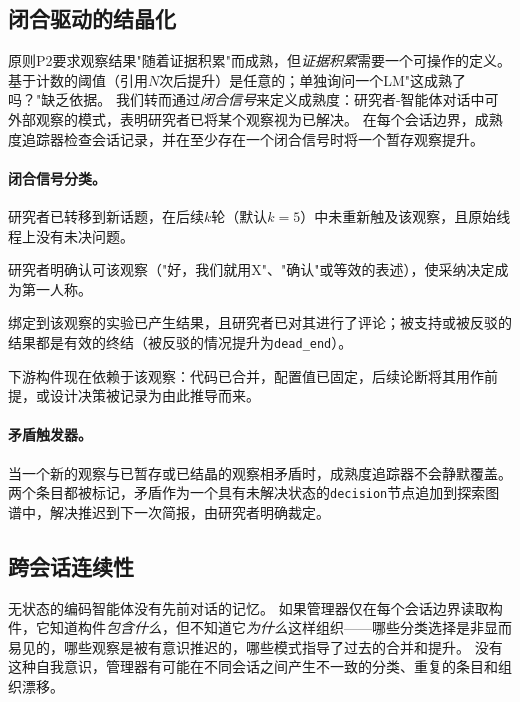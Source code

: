 \subsection{闭合驱动的结晶化}
\label{sec-lrm-maturity}

原则P2要求观察结果"随着证据积累"而成熟，但\emph{证据积累}需要一个可操作的定义。
基于计数的阈值（引用$N$次后提升）是任意的；单独询问一个LM"这成熟了吗？"缺乏依据。
我们转而通过\emph{闭合信号}来定义成熟度：研究者-智能体对话中可外部观察的模式，表明研究者已将某个观察视为已解决。
在每个会话边界，成熟度追踪器检查会话记录，并在至少存在一个闭合信号时将一个暂存观察提升。

\paragraph{闭合信号分类。}
\begin{description}[leftmargin=1.5em, itemsep=2pt, topsep=2pt]
    \item[话题放弃。] 研究者已转移到新话题，在后续$k$轮（默认$k=5$）中未重新触及该观察，且原始线程上没有未决问题。
    \item[口头确认。] 研究者明确认可该观察（"好，我们就用X"、"确认"或等效的表述），使采纳决定成为第一人称。
    \item[经验性解决。] 绑定到该观察的实验已产生结果，且研究者已对其进行了评论；被支持或被反驳的结果都是有效的终结（被反驳的情况提升为\texttt{dead\_end}）。
    \item[构件承诺。] 下游构件现在依赖于该观察：代码已合并，配置值已固定，后续论断将其用作前提，或设计决策被记录为由此推导而来。
\end{description}

\paragraph{矛盾触发器。}
当一个新的观察与已暂存或已结晶的观察相矛盾时，成熟度追踪器不会静默覆盖。
两个条目都被标记，矛盾作为一个具有未解决状态的\texttt{decision}节点追加到探索图谱中，解决推迟到下一次简报，由研究者明确裁定。

\subsection{跨会话连续性}
\label{sec-lrm-continuity}

无状态的编码智能体没有先前对话的记忆。
如果管理器仅在每个会话边界读取构件，它知道构件\emph{包含什么}，但不知道它\emph{为什么}这样组织——哪些分类选择是非显而易见的，哪些观察是被有意识推迟的，哪些模式指导了过去的合并和提升。
没有这种自我意识，管理器有可能在不同会话之间产生不一致的分类、重复的条目和组织漂移。

